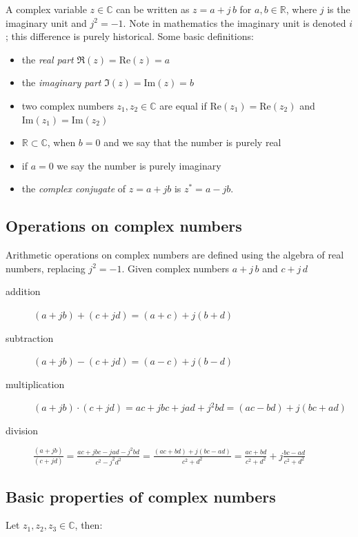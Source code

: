 A complex variable $z\in\mathbb{C}$ can be written as $z = a + j\, b$ for $a,b\in\mathbb{R}$, where $j$ is the imaginary unit and $j^2 = -1$. Note in mathematics the imaginary unit is denoted $i$; this difference is purely historical. Some basic definitions:

\begin{itemize}
\item the \emph{real part} $\Re(z) = \text{Re}(z) = a$
\item the \emph{imaginary part} $\Im(z) = \text{Im}(z) = b$
\item two complex numbers $z_1, z_2\in \mathbb{C}$ are equal if $\text{Re}(z_1) = \text{Re}(z_2)$ and $\text{Im}(z_1) = \text{Im}(z_2)$
\item $\mathbb{R} \subset \mathbb{C}$, when $b = 0$ and we say that the number is purely real
\item if $a = 0$ we say the number is purely imaginary
\item the \emph{complex conjugate} of $z = a + jb$ is $z^* = a - jb$.
\end{itemize}

\subsection*{Operations on complex numbers}

Arithmetic operations on complex numbers are defined using the algebra of real numbers, replacing $j^2 = -1$. Given complex numbers $a + j\, b$ and $c + j\, d$

\begin{description}
\item[addition] $(a + jb) + (c +jd) = (a+c) + j(b+d)$
\item[subtraction] $(a + jb) - (c +jd) = (a-c) + j(b-d)$
\item[multiplication] $(a + jb)\cdot(c +jd) = ac + jbc + jad + j^2 bd = (ac-bd) + j(bc+ad)$
\item[division] $\frac{(a + jb)}{(c +jd)} = \frac{ac+jbc-jad-j^2 bd}{c^2 -j^2 d^2} = \frac{(ac+bd) + j(bc-ad)}{c^2 + d^2} = \frac{ac+bd}{c^2 + d^2} + j \frac{bc-ad}{c^2 + d^2}$
\end{description}


\subsection*{Basic properties of complex numbers}

Let $z_1, z_2, z_3 \in \mathbb{C}$, then:

